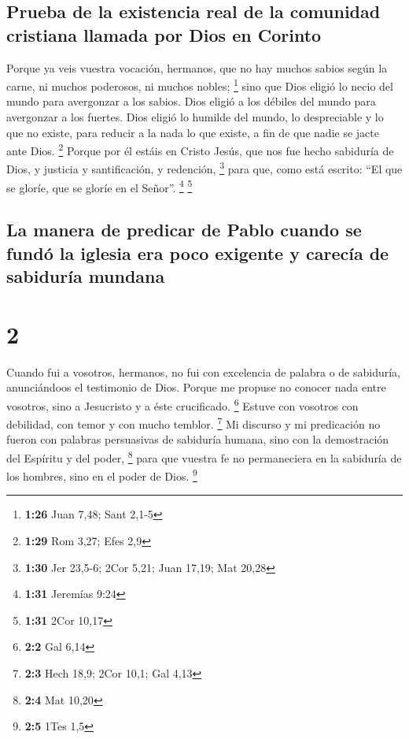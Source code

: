 \hypertarget{prueba-de-la-existencia-real-de-la-comunidad-cristiana-llamada-por-dios-en-corinto}{%
\subsection{Prueba de la existencia real de la comunidad cristiana
llamada por Dios en
Corinto}\label{prueba-de-la-existencia-real-de-la-comunidad-cristiana-llamada-por-dios-en-corinto}}

 Porque ya veis vuestra vocación, hermanos, que no hay
muchos sabios según la carne, ni muchos poderosos, ni muchos nobles;
\footnote{\textbf{1:26} Juan 7,48; Sant 2,1-5}  sino que
Dios eligió lo necio del mundo para avergonzar a los sabios. Dios eligió
a los débiles del mundo para avergonzar a los fuertes. 
Dios eligió lo humilde del mundo, lo despreciable y lo que no existe,
para reducir a la nada lo que existe,  a fin de que nadie
se jacte ante Dios. \footnote{\textbf{1:29} Rom 3,27; Efes 2,9}
 Porque por él estáis en Cristo Jesús, que nos fue hecho
sabiduría de Dios, y justicia y santificación, y redención, \footnote{\textbf{1:30}
  Jer 23,5-6; 2Cor 5,21; Juan 17,19; Mat 20,28}  para
que, como está escrito: ``El que se gloríe, que se gloríe en el Señor''.
\footnote{\textbf{1:31} Jeremías 9:24} \footnote{\textbf{1:31} 2Cor
  10,17}

\hypertarget{la-manera-de-predicar-de-pablo-cuando-se-funduxf3-la-iglesia-era-poco-exigente-y-carecuxeda-de-sabiduruxeda-mundana}{%
\subsection{La manera de predicar de Pablo cuando se fundó la iglesia
era poco exigente y carecía de sabiduría
mundana}\label{la-manera-de-predicar-de-pablo-cuando-se-funduxf3-la-iglesia-era-poco-exigente-y-carecuxeda-de-sabiduruxeda-mundana}}

\hypertarget{section-1}{%
\section{2}\label{section-1}}

 Cuando fui a vosotros, hermanos, no fui con excelencia de
palabra o de sabiduría, anunciándoos el testimonio de Dios.
 Porque me propuse no conocer nada entre vosotros, sino a
Jesucristo y a éste crucificado. \footnote{\textbf{2:2} Gal 6,14}
 Estuve con vosotros con debilidad, con temor y con mucho
temblor. \footnote{\textbf{2:3} Hech 18,9; 2Cor 10,1; Gal 4,13}
 Mi discurso y mi predicación no fueron con palabras
persuasivas de sabiduría humana, sino con la demostración del Espíritu y
del poder, \footnote{\textbf{2:4} Mat 10,20}  para que
vuestra fe no permaneciera en la sabiduría de los hombres, sino en el
poder de Dios. \footnote{\textbf{2:5} 1Tes 1,5}

